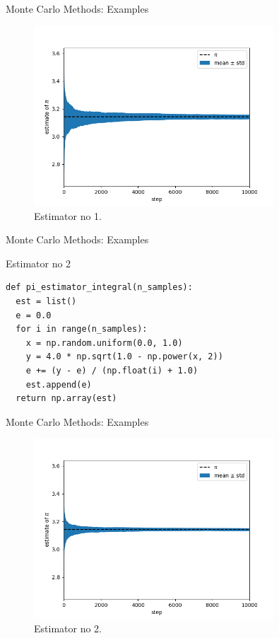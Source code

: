 \documentclass[10pt]{beamer}
\begin{document}
\begin{frame}[fragile]{Monte Carlo Methods: Examples}
\begin{figure}
  \includegraphics[width=0.8\textwidth]{code/estimator-1.png}
  \caption{Estimator no 1.}
\end{figure}
\end{frame}

\begin{frame}[fragile]{Monte Carlo Methods: Examples}
\begin{block}{Estimator no 2}
\begin{lstlisting}
def pi_estimator_integral(n_samples):
  est = list()
  e = 0.0
  for i in range(n_samples):
    x = np.random.uniform(0.0, 1.0)
    y = 4.0 * np.sqrt(1.0 - np.power(x, 2))
    e += (y - e) / (np.float(i) + 1.0)
    est.append(e)
  return np.array(est)
\end{lstlisting}
\end{block}
\end{frame}

\begin{frame}[fragile]{Monte Carlo Methods: Examples}
\begin{figure}
  \includegraphics[width=0.8\textwidth]{code/estimator-2.png}
  \caption{Estimator no 2.}
\end{figure}
\end{frame}
\end{document}
